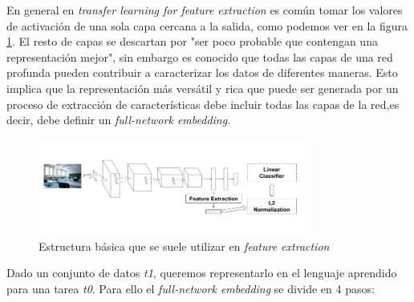 \documentclass[12,twoside]{TFG-GM}
\theoremstyle{definition}
\theoremstyle{remark}
\begin{document}
En general en \textit{transfer learning for feature extraction} es común tomar los valores de activación de una sola capa cercana a la salida, como podemos ver en la figura \ref{fig:base}. El resto de capas se descartan por 
"ser poco probable que contengan una representación mejor", sin embargo es conocido que todas las capas de una red profunda pueden contribuir a caracterizar los datos de diferentes maneras. Esto implica que la representación más versátil y rica que puede ser generada por un proceso de extracción de características debe incluir todas las capas de la red,es decir, debe definir un \textit{full-network embedding}. 
\begin{figure}[H]
\label{fig:base}
\centering
\includegraphics[width = 0.8\textwidth]{Images/basecrop.png} 
\caption{Estructura básica que se suele utilizar en \textit{feature extraction}}
\end{figure}
Dado un conjunto de datos \textit{t1}, queremos representarlo en el lenguaje aprendido para una tarea \textit{t0}. Para ello el \textit{full-network embedding} se divide en 4 pasos: 
\end{document}
